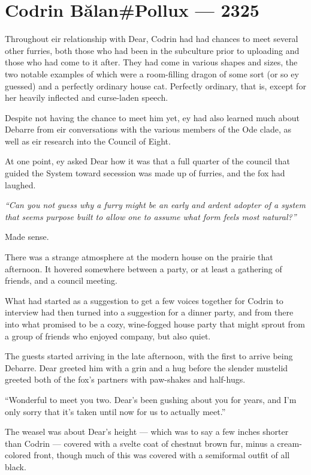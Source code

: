 \hypertarget{codrin-bux103lanpollux-2325}{%
\chapter{Codrin Bălan\#Pollux — 2325}\label{codrin-bux103lanpollux-2325}}

Throughout eir relationship with Dear, Codrin had had chances to meet several other furries, both those who had been in the subculture prior to uploading and those who had come to it after. They had come in various shapes and sizes, the two notable examples of which were a room-filling dragon of some sort (or so ey guessed) and a perfectly ordinary house cat. Perfectly ordinary, that is, except for her heavily inflected and curse-laden speech.

Despite not having the chance to meet him yet, ey had also learned much about Debarre from eir conversations with the various members of the Ode clade, as well as eir research into the Council of Eight.

At one point, ey asked Dear how it was that a full quarter of the council that guided the System toward secession was made up of furries, and the fox had laughed.

\emph{``Can you not guess why a furry might be an early and ardent adopter of a system that seems purpose built to allow one to assume what form feels most natural?''}

Made sense.

There was a strange atmosphere at the modern house on the prairie that afternoon. It hovered somewhere between a party, or at least a gathering of friends, and a council meeting.

What had started as a suggestion to get a few voices together for Codrin to interview had then turned into a suggestion for a dinner party, and from there into what promised to be a cozy, wine-fogged house party that might sprout from a group of friends who enjoyed company, but also quiet.

The guests started arriving in the late afternoon, with the first to arrive being Debarre. Dear greeted him with a grin and a hug before the slender mustelid greeted both of the fox's partners with paw-shakes and half-hugs.

``Wonderful to meet you two. Dear's been gushing about you for years, and I'm only sorry that it's taken until now for us to actually meet.''

The weasel was about Dear's height — which was to say a few inches shorter than Codrin — covered with a svelte coat of chestnut brown fur, minus a cream-colored front, though much of this was covered with a semiformal outfit of all black.

